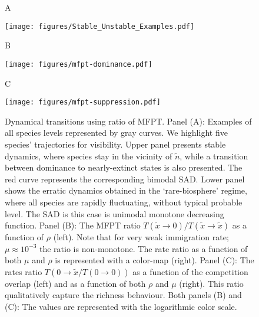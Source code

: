 \documentclass[9pt,twocolumn,twoside,lineno]{pnas-new}
\begin{document}
\begin{figure}[t!]
    \centering
    \begin{flushleft}
        A
   \end{flushleft}\texttt{[image: figures/Stable\_Unstable\_Examples.pdf]}
   \begin{flushleft}
        B
   \end{flushleft}
   \texttt{[image: figures/mfpt-dominance.pdf]}
    \begin{flushleft}
        C
   \end{flushleft}
        \texttt{[image: figures/mfpt-suppression.pdf]}
    \caption{Dynamical transitions using ratio of MFPT. Panel (A):  Examples of all species levels represented by gray curves.  We highlight five species' trajectories for visibility. %
    Upper panel presents stable dynamics, where species stay in the vicinity of $\tilde{n}$, while a transition between  dominance to nearly-extinct states is also presented. The red curve represents the corresponding bimodal SAD. Lower panel shows the erratic dynamics obtained in the `rare-biosphere' regime, where all species are rapidly fluctuating, without typical probable level. The SAD is this case is unimodal monotone decreasing function.  Panel (B): The MFPT ratio $ T(\tilde{x}\rightarrow 0) / T(\tilde{x}\rightarrow \tilde{x})$ as a function of $\rho$ (left). Note that for very weak immigration rate; $\mu\approx 10^{-3}$ the ratio is non-monotone.  The rate ratio as a function of both $\mu$ and $\rho$ is represented with a color-map (right). Panel (C):  The rates ratio $ T(0\rightarrow \tilde{x} / T(0\rightarrow 0))$ as a function of the competition overlap (left) and as a function of both $\rho$ and $\mu$ (right). This ratio qualitatively capture the richness behaviour. Both panels (B) and (C): The values are represented with the logarithmic color scale.     }
    \label{fig:turnover}
\end{figure}
\end{document}
